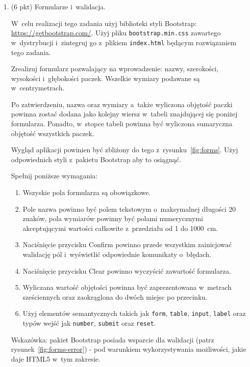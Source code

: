 \documentclass[12pt]{article}
\begin{document}
\begin{enumerate}
            \item\label{exc:forms}
            (6 pkt) Formularze i~walidacja.

            W~celu realizacji tego zadania użyj biblioteki styli Bootstrap: \url{https://getbootstrap.com/}.
            Użyj pliku \texttt{bootstrap.min.css} zawartego w~dystrybucji i~zintegruj go z~plikiem \texttt{index.html} będącym rozwiązaniem tego zadania.

            Zrealizuj formularz pozwalający na wprowadzenie: nazwy, szerokości, wysokości i~głębokości paczek.
            Wszelkie wymiary podawane są w~centrymetrach.

            Po zatwierdzeniu, nazwa oraz wymiary a~także wyliczona objętość paczki powinna zostać dodana jako kolejny wiersz w~tabeli znajdującej się poniżej formularza.
            Ponadto, w~stopce tabeli powinna być wyliczona sumaryczna objętość wszystkich paczek.

            Wygląd aplikacji powinien być zbliżony do tego z~rysunku~\ref{fig:forms}.
            Użyj odpowiednich styli z~pakietu Bootstrap aby to osiągnąć.

            Spełnij poniższe wymagania:
            \begin{enumerate}
                \item Wszyskie pola formularza są obowiązkowe.
                \item Pole nazwa powinno być polem tekstowym o~maksymalnej długości 20 znaków, pola wymiarów powinny być polami numerycznymi akceptującymi wartości całkowite z~przedziału od 1 do 1000~cm.
                \item Naciśnięcie przycisku Confirm powinno przede wszystkim zainicjować walidację pól i~wyświetlić odpowiednie komunikaty o~błędach.
                \item Naciśnięcie przycisku Clear powinno wyczyścić zawartość formularza.
                \item Wyliczana wartość objętości powinna być zaprezentowana w~metrach sześciennych oraz zaokrąglona do dwóch miejsc po przecinku.
                \item Użyj elementów semantycznych takich jak \texttt{form}, \texttt{table}, \texttt{input}, \texttt{label} oraz typów wejść jak \texttt{number}, \texttt{submit} oraz \texttt{reset}.
            \end{enumerate}

            Wskazówka: pakiet Bootstrap posiada wsparcie dla walidacji (patrz rysunek~\ref{fig:forms-error}) - pod warunkiem wykorzystywania możliwości, jakie daje HTML5 w~tym zakresie.


\end{enumerate}
\end{document}
